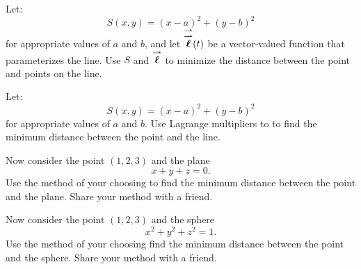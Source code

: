 \documentclass[handout,nooutcomes,noauthor]{ximera}
\begin{document}
\begin{problem}
  Let:
  \[
  S(x,y) = (x-a)^2 + (y-b)^2
  \]
  for appropriate values of $a$ and $b$, and let ${\overset{\boldsymbol{\rightharpoonup}}{\mathbf{{\overset{\boldsymbol{\rightharpoonup}}{\mathbf{\boldsymbol{\ell}}}}}}}(t)$ be a
  vector-valued function that parameterizes the line. Use $S$ and
  ${\overset{\boldsymbol{\rightharpoonup}}{\mathbf{\boldsymbol{\ell}}}}$ to minimize the distance between the point and points on the
  line.
\end{problem}

\begin{problem}
  Let:
  \[
  S(x,y) = (x-a)^2 + (y-b)^2
  \]
  for appropriate values of $a$ and $b$. Use Lagrange multipliers to
  to find the minimum distance between the point and the line.
\end{problem}

\begin{problem}
  Now consider the point $(1,2,3)$ and the plane
  \[
  x + y+z = 0.
  \]
  Use the method of your choosing to find the minimum distance between
  the point and the plane. Share your method with a friend.
\end{problem}


\begin{problem}
  Now consider the point $(1,2,3)$ and the sphere
  \[
  x^2 + y^2+z^2 = 1.
  \]
  Use the method of your choosing find the minimum distance between
  the point and the sphere.  Share your method with a friend.
\end{problem}
\end{document}
